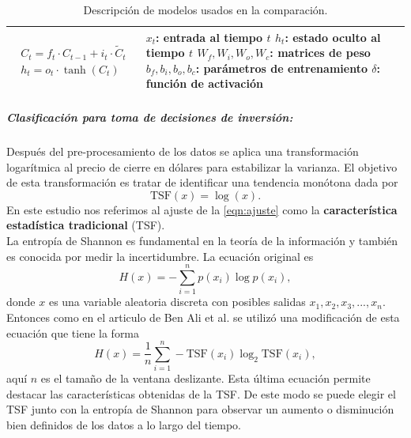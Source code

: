 \begin{table}
\begin{adjustbox}{width=0.95\textwidth}
\begin{tabular} {m{2cm} m{9cm} m{7cm}}
\begin{align}
\begin{split}
				C_{t} = f_{t} \cdot C_{t-1}+i_{t} \cdot \tilde{C}_{t}\\
				h_{t} = o_{t}\cdot \tanh(C_{t})
			\end{split}
		\end{align}
		& 
		$x_{t}$: entrada al tiempo $t$ \newline
		$h_{t}$: estado oculto al tiempo $t$	\newline
		$W_{f},W_{i},W_{o},W_{c}$: matrices de peso\newline
		$b_{f},b_{i},b_{o},b_{c}$: parámetros de entrenamiento\newline
		$\delta$: función de activación
		\\
		\bottomrule
	\end{tabular}
	\end{adjustbox}
	\caption{Descripción de modelos usados en la comparación.}
	\label{tab:Table8}
\end{table}


\subparagraph{Clasificación para toma de decisiones de inversión:} Después del pre-procesamiento de los datos se aplica una transformación logarítmica al precio de cierre en dólares para estabilizar la varianza. El objetivo de esta transformación es tratar de identificar una tendencia monótona dada por
\begin{equation}
	\textrm{TSF}(x) = \log(x).
	\label{eqn:ajuste}
\end{equation}
En este estudio nos referimos al ajuste de la \cref{eqn:ajuste} como la \textbf{característica estadística tradicional} (TSF)\parencite{pinedo-sanchezVibrationAnalysisBearings2020}.\\

La entropía de Shannon es fundamental en la teoría de la información y también es conocida por medir la incertidumbre. La ecuación original es
\[ H(x) = -\sum_{i=1}^{n}p(x_i)\log{p(x_i)}, \]
donde $x$ es una variable aleatoria discreta con posibles salidas $x_1,x_2,x_3,...,x_n$. Entonces como en el articulo de Ben Ali et al. \parencite*{benaliNewEnhancedFeature2014} se utilizó una modificación de esta ecuación que tiene la forma
\[ H(x) = \frac{1}{n} \sum_{i=1}^{n}-\textrm{TSF}(x_i)\log_2{\textrm{TSF}(x_i)}, \]
aquí $n$ es el tamaño de la ventana deslizante. Esta última ecuación permite destacar las características obtenidas de la TSF. De este modo se puede elegir el TSF junto con la entropía de Shannon para observar un aumento o disminución bien definidos de los datos a lo largo del tiempo.

